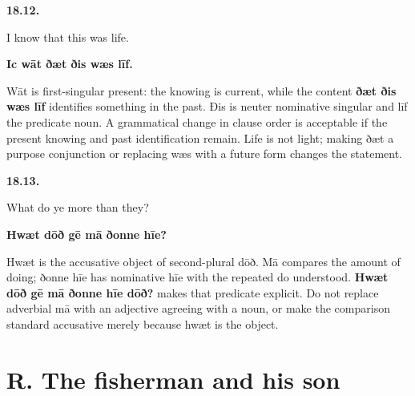 \par\begin{minipage}{\linewidth}\raggedright
\textbf{18.12.}

I know that this was life.

\textbf{Ic wāt ðæt ðis wæs līf.}

Wāt is first-singular present: the knowing is current, while the content \textbf{ðæt ðis wæs līf} identifies something in the past. Ðis is neuter nominative singular and līf the predicate noun. A grammatical change in clause order is acceptable if the present knowing and past identification remain. Life is not light; making ðæt a purpose conjunction or replacing wæs with a future form changes the statement.

\end{minipage}\par\addvspace{4pt}

\par\begin{minipage}{\linewidth}\raggedright
\textbf{18.13.}

What do ye more than they?

\textbf{Hwæt dōð gē mā ðonne hīe?}

Hwæt is the accusative object of second-plural dōð. Mā compares the amount of doing; ðonne hīe has nominative hīe with the repeated do understood. \textbf{Hwæt dōð gē mā ðonne hīe dōð?} makes that predicate explicit. Do not replace adverbial mā with an adjective agreeing with a noun, or make the comparison standard accusative merely because hwæt is the object.

\end{minipage}\par\addvspace{4pt}

\section*{R. The fisherman and his son}

